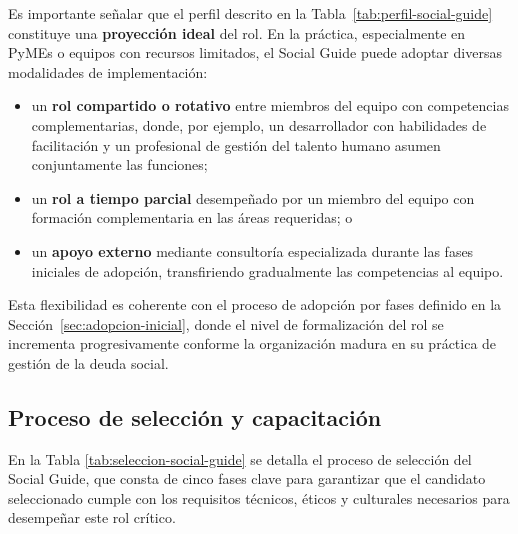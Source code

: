 Es importante señalar que el perfil descrito en la Tabla~\ref{tab:perfil-social-guide} constituye una \textbf{proyección ideal} del rol. En la práctica, especialmente en PyMEs o equipos con recursos limitados, el Social Guide puede adoptar diversas modalidades de implementación:
\begin{itemize}
    \item un \textbf{rol compartido o rotativo} entre miembros del equipo con competencias complementarias, donde, por ejemplo, un desarrollador con habilidades de facilitación y un profesional de gestión del talento humano asumen conjuntamente las funciones;
    \item un \textbf{rol a tiempo parcial} desempeñado por un miembro del equipo con formación complementaria en las áreas requeridas; o
    \item un \textbf{apoyo externo} mediante consultoría especializada durante las fases iniciales de adopción, transfiriendo gradualmente las competencias al equipo.
\end{itemize}
Esta flexibilidad es coherente con el proceso de adopción por fases definido en la Sección~\ref{sec:adopcion-inicial}, donde el nivel de formalización del rol se incrementa progresivamente conforme la organización madura en su práctica de gestión de la deuda social.

\subsection{Proceso de selección y capacitación}

En la Tabla \ref{tab:seleccion-social-guide} se detalla el proceso de selección del Social Guide, que consta de cinco fases clave para garantizar que el candidato seleccionado cumple con los requisitos técnicos, éticos y culturales necesarios para desempeñar este rol crítico.

\begingroup
\scriptsize
\renewcommand{\arraystretch}{1.4}
\setlength{\tabcolsep}{4pt}
\setlength{\LTleft}{0pt}
\setlength{\LTright}{0pt}

